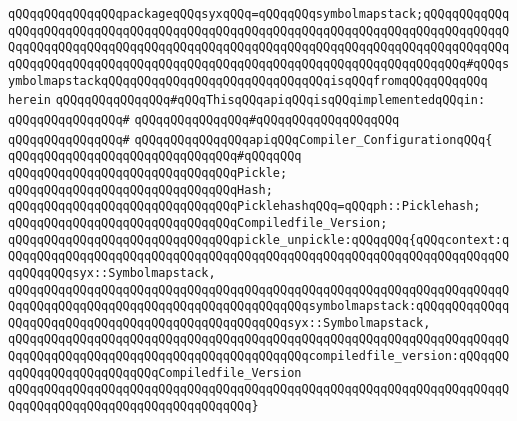 \verb|qQQqqQQqqQQqqQQqpackageqQQqsyxqQQq=qQQqqQQqsymbolmapstack;qQQqqQQqqQQqqQQqqQQqqQQqqQQqqQQqqQQqqQQqqQQqqQQqqQQqqQQqqQQqqQQqqQQqqQQqqQQqqQQqqQQqqQQqqQQqqQQqqQQqqQQqqQQqqQQqqQQqqQQqqQQqqQQqqQQqqQQqqQQqqQQqqQQqqQQqqQQqqQQqqQQqqQQqqQQqqQQqqQQqqQQqqQQqqQQqqQQqqQQqqQQqqQQqqQQqqQQq#qQQqsymbolmapstackqQQqqQQqqQQqqQQqqQQqqQQqqQQqqQQqisqQQqfromqQQqqQQqqQQq|\newline
\verb|herein|\newline
\newline
\verb|qQQqqQQqqQQqqQQq#qQQqThisqQQqapiqQQqisqQQqimplementedqQQqin:|\newline
\verb|qQQqqQQqqQQqqQQq#|\newline
\verb|qQQqqQQqqQQqqQQq#qQQqqQQqqQQqqQQqqQQq|\newline
\verb|qQQqqQQqqQQqqQQq#|\newline
\verb|qQQqqQQqqQQqqQQqapiqQQqCompiler_ConfigurationqQQq{|\newline
\verb|qQQqqQQqqQQqqQQqqQQqqQQqqQQqqQQq#qQQqqQQq|\newline
\verb|qQQqqQQqqQQqqQQqqQQqqQQqqQQqqQQqPickle;|\newline
\verb|qQQqqQQqqQQqqQQqqQQqqQQqqQQqqQQqHash;|\newline
\verb|qQQqqQQqqQQqqQQqqQQqqQQqqQQqqQQqPicklehashqQQq=qQQqph::Picklehash;|\newline
\verb|qQQqqQQqqQQqqQQqqQQqqQQqqQQqqQQqCompiledfile_Version;|\newline
\newline
\verb|qQQqqQQqqQQqqQQqqQQqqQQqqQQqqQQqpickle_unpickle:qQQqqQQq{qQQqcontext:qQQqqQQqqQQqqQQqqQQqqQQqqQQqqQQqqQQqqQQqqQQqqQQqqQQqqQQqqQQqqQQqqQQqqQQqqQQqqQQqsyx::Symbolmapstack,|\newline
\verb|qQQqqQQqqQQqqQQqqQQqqQQqqQQqqQQqqQQqqQQqqQQqqQQqqQQqqQQqqQQqqQQqqQQqqQQqqQQqqQQqqQQqqQQqqQQqqQQqqQQqqQQqqQQqqQQqsymbolmapstack:qQQqqQQqqQQqqQQqqQQqqQQqqQQqqQQqqQQqqQQqqQQqqQQqqQQqsyx::Symbolmapstack,|\newline
\verb|qQQqqQQqqQQqqQQqqQQqqQQqqQQqqQQqqQQqqQQqqQQqqQQqqQQqqQQqqQQqqQQqqQQqqQQqqQQqqQQqqQQqqQQqqQQqqQQqqQQqqQQqqQQqqQQqcompiledfile_version:qQQqqQQqqQQqqQQqqQQqqQQqqQQqCompiledfile_Version|\newline
\verb|qQQqqQQqqQQqqQQqqQQqqQQqqQQqqQQqqQQqqQQqqQQqqQQqqQQqqQQqqQQqqQQqqQQqqQQqqQQqqQQqqQQqqQQqqQQqqQQqqQQqqQQq}|\newline
